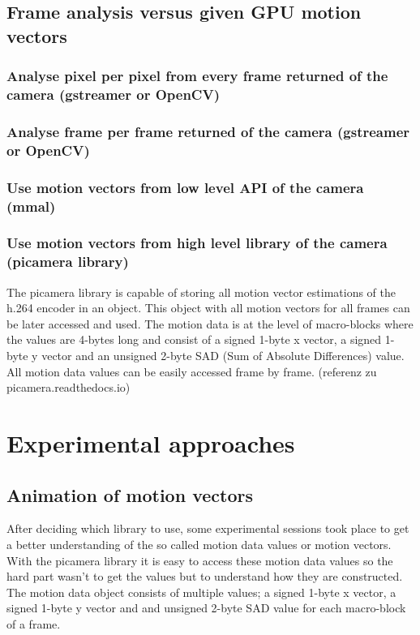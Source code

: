 \documentclass[12pt, a4paper]{report}
\begin{document}
\section{Frame analysis versus given GPU motion vectors}

\subsection{Analyse pixel per pixel from every frame returned of the camera (gstreamer or OpenCV)}

\subsection{Analyse frame per frame returned of the camera (gstreamer or OpenCV)}
\subsection{Use motion vectors from low level API of the camera (mmal)}
\subsection{Use motion vectors from high level library of the camera (picamera library)}
The picamera library is capable of storing all motion vector estimations of the h.264 encoder in an object. This object with all motion vectors for all frames can be later accessed and used. The motion data is at the level of macro-blocks where the values are 4-bytes long and consist of a signed 1-byte x vector, a signed 1-byte y vector and an unsigned 2-byte SAD (Sum of Absolute Differences) value. All motion data values can be easily accessed frame by frame.
(referenz zu picamera.readthedocs.io)

\chapter {Experimental approaches}
\section{Animation of motion vectors}
After deciding which library to use, some experimental sessions took place to get a better understanding of the so called motion data values or motion vectors. 
With the picamera library it is easy to access these motion data values so the hard part wasn't to get the values but to understand how they are constructed. 
The motion data object consists of multiple values; a signed 1-byte x vector, a signed 1-byte y vector and and unsigned 2-byte SAD value for each macro-block of a frame.
\end{document}
